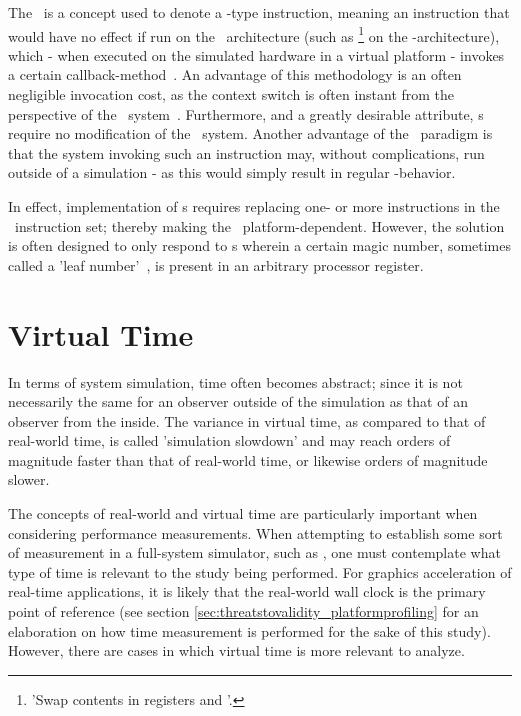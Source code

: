 The \dvttermmagicinstruction\ is a concept used to denote a -type instruction, meaning an instruction that would have no effect if run on the \dvttermtarget\ architecture (such as \footnote{'Swap contents in registers  and '.} on the \dvttermxeightysix -architecture), which - when executed on the simulated hardware in a virtual platform - invokes a certain callback-method~.
An advantage of this methodology is an often negligible invocation cost, as the context switch is often instant from the perspective of the \dvttermtarget\ system~.
Furthermore, and a greatly desirable attribute, \dvttermmagicinstruction s require no modification of the \dvttermtarget\ system.
Another advantage of the \dvttermmagicinstruction\ paradigm is that the system invoking such an instruction may, without complications, run outside of a simulation - as this would simply result in regular -behavior.

In effect, implementation of \dvttermmagicinstruction s requires replacing one- or more instructions in the \dvttermtarget\ instruction set; thereby making the \dvttermmagicinstruction\ platform-dependent.
However, the solution is often designed to only respond to \dvttermmagicinstruction s wherein a certain magic number, sometimes called a 'leaf number'~, is present in an arbitrary processor register.

\section{Virtual Time}
\label{sec:backgroundandrelatedwork_virtualtime}
In terms of system simulation, time often becomes abstract; since it is not necessarily the same for an observer outside of the simulation as that of an observer from the inside.
The variance in virtual time, as compared to that of real-world time, is called 'simulation slowdown' and may reach orders of magnitude faster than that of real-world time, or likewise orders of magnitude slower.

The concepts of real-world and virtual time are particularly important when considering performance measurements.
When attempting to establish some sort of measurement in a full-system simulator, such as \dvttermsimics , one must contemplate what type of time is relevant to the study being performed.
For graphics acceleration of real-time applications, it is likely that the real-world wall clock is the primary point of reference (see section \ref{sec:threatstovalidity_platformprofiling} for an elaboration on how time measurement is performed for the sake of this study).
However, there are cases in which virtual time is more relevant to analyze.
